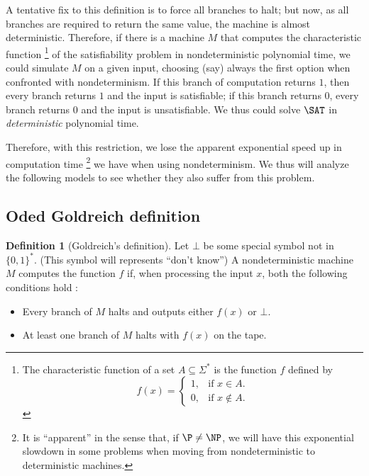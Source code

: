 \documentclass[12pt]{article}
\theoremstyle{definition}
\newtheorem{definition}{Definition}
\begin{document}
A tentative fix to this definition is to force all branches to halt;
but now, as all branches are required to return the same value,
the machine is almost deterministic.
Therefore, if there is a machine $M$ that computes the characteristic function%
\footnote{
    The characteristic function of a set $A \subseteq \Sigma^*$
    is the function $f$ defined by
    \begin{equation*}
        f(x) = \begin{cases}
            1, & \text{if $x \in A$}. \\
            0, & \text{if $x \notin A$}.
        \end{cases}
    \end{equation*}
}
of the satisfiability problem in nondeterministic polynomial time,
we could simulate $M$ on a given input,
choosing (say) always the first option when confronted with nondeterminism.
If this branch of computation returns $1$,
then every branch returns $1$ and the input is satisfiable;
if this branch returns $0$, every branch returns $0$ and the input is unsatisfiable.
We thus could solve $\SAT$ in \emph{deterministic} polynomial time.

Therefore, with this restriction,
we lose the apparent exponential speed up in computation time%
\footnote{
    It is ``apparent'' in the sense that,
    if $\P \neq \NP$,
    we will have this exponential slowdown in some problems
    when moving from nondeterministic to deterministic machines.
}
we have when using nondeterminism.
We thus will analyze the following models
to see whether they also suffer from this problem.

\subsection{Oded Goldreich definition}

\begin{definition}[Goldreich's definition]
    Let $\bot$ be some special symbol not in $\{0, 1\}^*$.
    (This symbol will represents ``don't know'')
    A nondeterministic machine $M$ computes the function $f$ if,
    when processing the input $x$,
    both the following conditions hold \cite[p.~168]{Goldreich2008}:
    \begin{itemize}
        \item Every branch of $M$ halts
            and outputs either $f(x)$ or $\bot$.
        \item At least one branch of $M$ halts with $f(x)$ on the tape.
    \end{itemize}
\end{definition}
\end{document}
